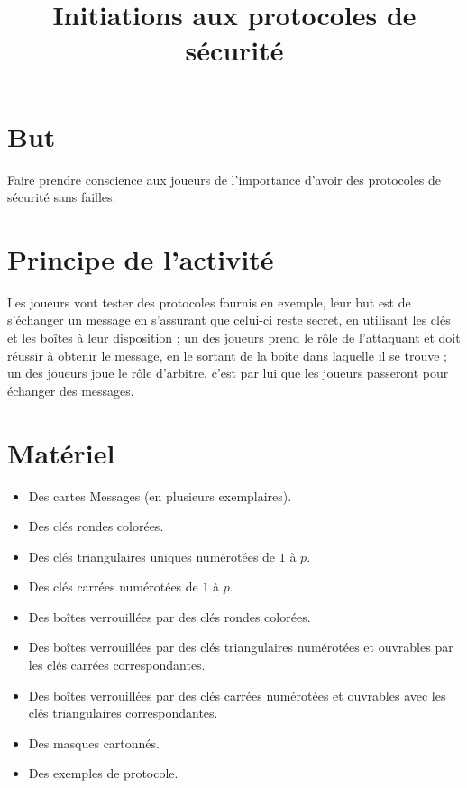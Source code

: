 \documentclass[a4paper,10pt]{article}
\title{Initiations aux protocoles de sécurité}
\begin{document}
\maketitle


\section{But}
Faire prendre conscience aux joueurs de l'importance d'avoir des protocoles de sécurité sans failles.

\section{Principe de l'activité}
Les joueurs vont tester des protocoles fournis en exemple, leur but est de s'échanger un message en s'assurant que celui-ci reste secret, en utilisant les clés et les boîtes à leur disposition ; un des joueurs prend le rôle de l'attaquant et doit réussir à obtenir le message, en le sortant de la boîte dans laquelle il se trouve ; un des joueurs joue le rôle d'arbitre, c'est par lui que les joueurs passeront pour échanger des messages.

\section{Matériel}
\begin{itemize}
\item Des cartes Messages (en plusieurs exemplaires).
\item Des clés rondes colorées.
\item Des clés triangulaires uniques numérotées de $1$ à $p$.
\item Des clés carrées numérotées de $1$ à $p$.
\item Des boîtes verrouillées par des clés rondes colorées.
\item Des boîtes verrouillées par des clés triangulaires numérotées et ouvrables par les clés carrées correspondantes.
\item Des boîtes verrouillées par des clés carrées numérotées et ouvrables avec les clés triangulaires correspondantes.
\item Des masques cartonnés.
\item Des exemples de protocole.
\end{itemize}
\end{document}
